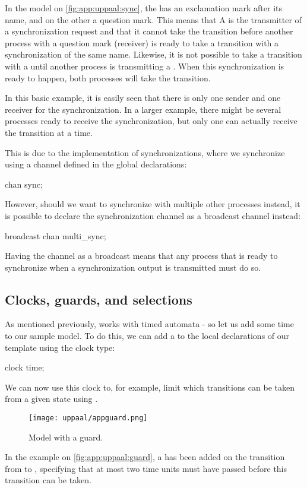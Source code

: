 In the model on \autoref{fig:app:uppaal:sync}, the  has an exclamation mark after its name, and on the other a question mark.
This means that A is the transmitter of a synchronization request and that it cannot take the transition before another process with a question mark (receiver) is ready to take a transition with a synchronization of the same name.
Likewise, it is not possible to take a transition with a  until another process is transmitting a .
When this synchronization is ready to happen, both processes will take the transition.

In this basic example, it is easily seen that there is only one sender and one receiver for the synchronization.
In a larger example, there might be several processes ready to receive the synchronization, but only one can actually receive the transition at a time.

This is due to the implementation of synchronizations, where we synchronize using a channel defined in the global declarations:

\begin{uppaalcode}
chan sync;
\end{uppaalcode}

However, should we want to synchronize with multiple other processes instead, it is possible to declare the synchronization channel as a broadcast channel instead:

\begin{uppaalcode}
broadcast chan multi_sync;
\end{uppaalcode}

Having the channel as a broadcast means that any process that is ready to synchronize when a synchronization output is transmitted must do so.


\subsection{Clocks, guards, and selections}
As mentioned previously, \uppaal works with timed automata - so let us add some time to our sample model.
To do this, we can add a  to the local declarations of our template using the clock type:
\begin{uppaalcode}
clock time;
\end{uppaalcode}

We can now use this clock to, for example, limit which transitions can be taken from a given state using .

\begin{figure}[H]
    \centering
    \texttt{[image: uppaal/appguard.png]}
    \caption{Model with a guard.}
    \label{fig:app:uppaal:guard}
\end{figure}
In the example on \autoref{fig:app:uppaal:guard}, a  has been added on the transition from  to , specifying that at most two time units must have passed before this transition can be taken.

